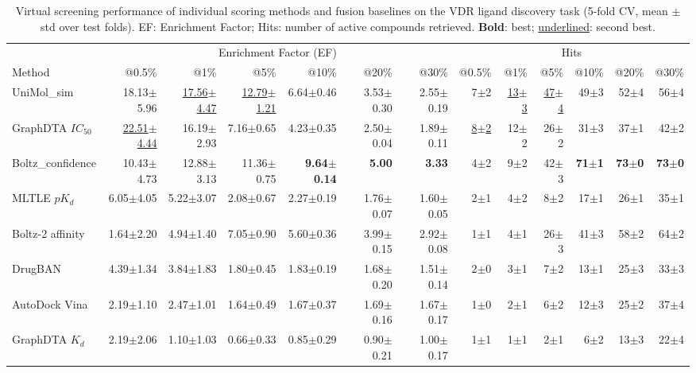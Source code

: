 \begin{table}[htbp!]
\centering
\caption{Virtual screening performance of individual scoring methods and fusion baselines on the VDR ligand discovery task (5-fold CV, mean $\pm$ std over test folds). EF: Enrichment Factor; Hits: number of active compounds retrieved. \textbf{Bold}: best; \underline{underlined}: second best.}
\label{tab:fusion_performance}
\small
\begin{tabular}{lrrrrrr|rrrrrr}
\toprule
& \multicolumn{6}{c|}{Enrichment Factor (EF)} & \multicolumn{6}{c}{Hits} \\
Method & @0.5\% & @1\% & @5\% & @10\% & @20\% & @30\% & @0.5\% & @1\% & @5\% & @10\% & @20\% & @30\% \\
\midrule
UniMol_sim & 18.13$\pm$5.96 & \underline{17.56$\pm$4.47} & \underline{12.79$\pm$1.21} & 6.64$\pm$0.46 & 3.53$\pm$0.30 & 2.55$\pm$0.19 & 7$\pm$2 & \underline{13$\pm$3} & \underline{47$\pm$4} & 49$\pm$3 & 52$\pm$4 & 56$\pm$4 \\
GraphDTA $IC_{50}$ & \underline{22.51$\pm$4.44} & 16.19$\pm$2.93 & 7.16$\pm$0.65 & 4.23$\pm$0.35 & 2.50$\pm$0.04 & 1.89$\pm$0.11 & \underline{8$\pm$2} & 12$\pm$2 & 26$\pm$2 & 31$\pm$3 & 37$\pm$1 & 42$\pm$2 \\
Boltz_confidence & 10.43$\pm$4.73 & 12.88$\pm$3.13 & 11.36$\pm$0.75 & \textbf{9.64$\pm$0.14} & \textbf{5.00} & \textbf{3.33} & 4$\pm$2 & 9$\pm$2 & 42$\pm$3 & \textbf{71$\pm$1} & \textbf{73$\pm$0} & \textbf{73$\pm$0} \\
MLTLE $pK_d$ & 6.05$\pm$4.05 & 5.22$\pm$3.07 & 2.08$\pm$0.67 & 2.27$\pm$0.19 & 1.76$\pm$0.07 & 1.60$\pm$0.05 & 2$\pm$1 & 4$\pm$2 & 8$\pm$2 & 17$\pm$1 & 26$\pm$1 & 35$\pm$1 \\
Boltz-2 affinity & 1.64$\pm$2.20 & 4.94$\pm$1.40 & 7.05$\pm$0.90 & 5.60$\pm$0.36 & 3.99$\pm$0.15 & 2.92$\pm$0.08 & 1$\pm$1 & 4$\pm$1 & 26$\pm$3 & 41$\pm$3 & 58$\pm$2 & 64$\pm$2 \\
DrugBAN & 4.39$\pm$1.34 & 3.84$\pm$1.83 & 1.80$\pm$0.45 & 1.83$\pm$0.19 & 1.68$\pm$0.20 & 1.51$\pm$0.14 & 2$\pm$0 & 3$\pm$1 & 7$\pm$2 & 13$\pm$1 & 25$\pm$3 & 33$\pm$3 \\
AutoDock Vina & 2.19$\pm$1.10 & 2.47$\pm$1.01 & 1.64$\pm$0.49 & 1.67$\pm$0.37 & 1.69$\pm$0.16 & 1.67$\pm$0.17 & 1$\pm$0 & 2$\pm$1 & 6$\pm$2 & 12$\pm$3 & 25$\pm$2 & 37$\pm$4 \\
GraphDTA $K_{d}$ & 2.19$\pm$2.06 & 1.10$\pm$1.03 & 0.66$\pm$0.33 & 0.85$\pm$0.29 & 0.90$\pm$0.21 & 1.00$\pm$0.17 & 1$\pm$1 & 1$\pm$1 & 2$\pm$1 & 6$\pm$2 & 13$\pm$3 & 22$\pm$4 \\

\end{tabular}
\end{table}
